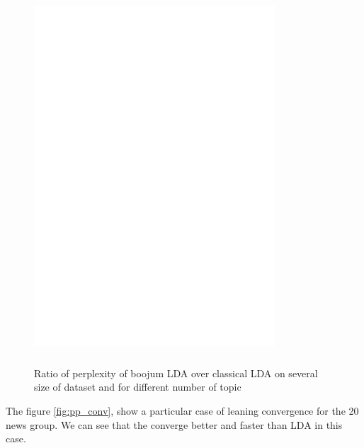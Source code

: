 \begin{figure}[h]
\label{fig:pp_D}
\includegraphics[width=9cm, height=14cm]{results/pp_D.eps}
\caption{Ratio of perplexity of boojum LDA over classical LDA on several size of dataset and for different number of topic}
\end{figure}

The figure \ref{fig:pp_conv}, show a particular case of leaning convergence for the 20 news group. We can see that the converge better and faster than LDA in this case. 

